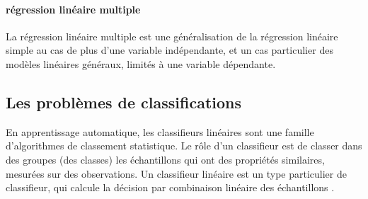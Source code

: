 	
	
	\paragraph*{régression linéaire multiple}
	La régression linéaire multiple est une généralisation de la régression linéaire simple au cas de plus d'une variable indépendante, et un cas particulier des modèles linéaires généraux, limités à une variable dépendante.
	
	
	\subsection{Les problèmes de classifications} \label{sec:classificarion_problem}
	En apprentissage automatique, les classifieurs linéaires sont une famille d'algorithmes de classement statistique. Le rôle d'un classifieur est de classer dans des groupes (des classes) les échantillons qui ont des propriétés similaires, mesurées sur des observations. Un classifieur linéaire est un type particulier de classifieur, qui calcule la décision par combinaison linéaire des échantillons \cite{antoine2018apprentissage}.
	
